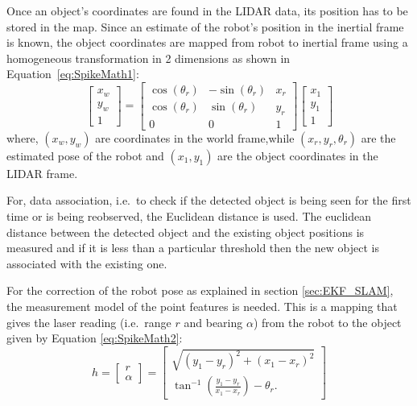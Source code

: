 Once an object's coordinates are found in the LIDAR data, its position has to be stored in the map.  Since an estimate of the robot's position in the inertial frame is known, the object coordinates are mapped from robot to inertial frame using a homogeneous transformation in 2 dimensions as shown in Equation~\ref{eq:SpikeMath1}:
\begin{equation}
\begin{bmatrix}
x_w\\y_w\\1
\end{bmatrix}=
\begin{bmatrix}
\cos(\theta_r) & -\sin(\theta_r) & x_r\\
\cos(\theta_r) & \sin(\theta_r) & y_r\\
0 & 0 & 1
\end{bmatrix}
\begin{bmatrix}
x_1\\y_1\\1
\end{bmatrix}
\label{eq:SpikeMath1}
\end{equation}
where, $ (x_w,y_w) $ are coordinates in the world frame,while $ (x_r,y_r,\theta_r) $ are the estimated pose of the robot and $ (x_1,y_1) $ are the object coordinates in the LIDAR frame.

For, data association, i.e.\ to check if the detected object is being seen for the first time or is being reobserved, the Euclidean distance is used. The euclidean distance between the detected object and the existing object positions is measured and if it is less than a particular threshold then the new object is associated with the existing one. 

For the correction of the robot pose as explained in section \ref{sec:EKF_SLAM}, the measurement model of the point features is needed. This is a mapping that gives the laser reading (i.e.\ range $ r $ and bearing $ \alpha $) from the robot to the object given by Equation \ref{eq:SpikeMath2}:
\begin{equation}
	\label{eq:SpikeMath2}
	h=\begin{bmatrix}
	r\\\alpha
	\end{bmatrix}=
	\begin{bmatrix}
	\sqrt{(y_1-y_r)^2+(x_1-x_r)^2} \\
	\tan^{-1}\left(\frac{y_1-y_r}{x_1-x_r}\right)-\theta_r.
	\end{bmatrix}
\end{equation} 


